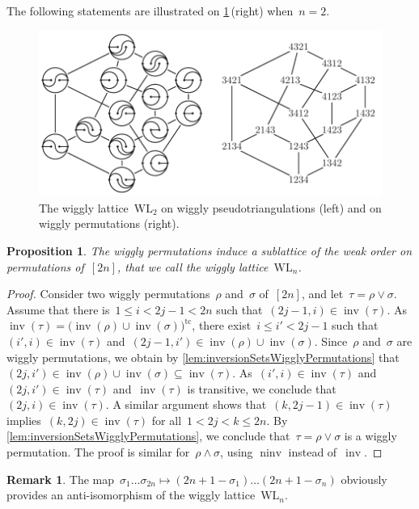 \documentclass{amsart}
\newtheorem{proposition}[theorem]{Proposition}
\theoremstyle{definition}
\newtheorem{remark}[theorem]{Remark}
\DeclareMathOperator{\inv}{inv} %
\DeclareMathOperator{\ninv}{ninv} %
\newcommand{\darkblue}{\color{darkblue}} %
\newcommand{\defn}[1]{\textsl{\darkblue #1}} %
\newcommand{\meet}{\wedge} %
\newcommand{\join}{\vee} %
\newcommand{\wigglyLattice}{\mathrm{WL}} %
\begin{document}
The following statements are illustrated on \cref{fig:wigglyLattice}\,(right) when~${n = 2}$.
%
\begin{figure}
\centerline{\includegraphics[scale=1.1]{wigglyLattice}}
\caption{The wiggly lattice~$\wigglyLattice_2$ on wiggly pseudotriangulations (left) and on wiggly permutations (right).}
\label{fig:wigglyLattice}
\end{figure}

\begin{proposition}
The wiggly permutations induce a sublattice of the weak order on permutations of~$[2n]$, that we call the \defn{wiggly lattice}~$\wigglyLattice_n$.
\end{proposition}

\begin{proof}
Consider two wiggly permutations~$\rho$ and~$\sigma$ of~$[2n]$, and let~$\tau = \rho \join \sigma$.
Assume that there is~$1 \le i < 2j-1 < 2n$ such that~$(2j-1, i) \in \inv(\tau)$.
As $\inv(\tau) = \big( \inv(\rho) \cup \inv(\sigma) \big)^\textrm{tc}$, there exist~$i \le i' < 2j-1$ such that~$(i', i) \in \inv(\tau)$ and~$(2j-1, i') \in \inv(\rho) \cup \inv(\sigma)$.
Since~$\rho$ and~$\sigma$ are wiggly permutations, we obtain by \cref{lem:inversionSetsWigglyPermutations} that~$(2j, i') \in \inv(\rho) \cup \inv(\sigma) \subseteq \inv(\tau)$.
As~$(i', i) \in \inv(\tau)$ and~$(2j, i') \in \inv(\tau)$ and~$\inv(\tau)$ is transitive, we conclude that~$(2j,i) \in \inv(\tau)$.
A similar argument shows that~$(k, 2j-1) \in \inv(\tau)$ implies~$(k, 2j) \in \inv(\tau)$ for all~$1 < 2j < k \le 2n$.
By \cref{lem:inversionSetsWigglyPermutations}, we conclude that~$\tau = \rho \join \sigma$ is a wiggly permutation.
The proof is similar for~$\rho \meet \sigma$, using $\ninv$ instead of~$\inv$.
\end{proof}

\begin{remark}
\label{rem:wigglyLatticeAntiIsomorphism}
The map~$\sigma_1 \dots \sigma_{2n} \mapsto (2n+1-\sigma_1) \dots (2n+1-\sigma_n)$ obviously provides an anti-isomorphism of the wiggly lattice~$\wigglyLattice_n$.
\end{remark}
\end{document}
